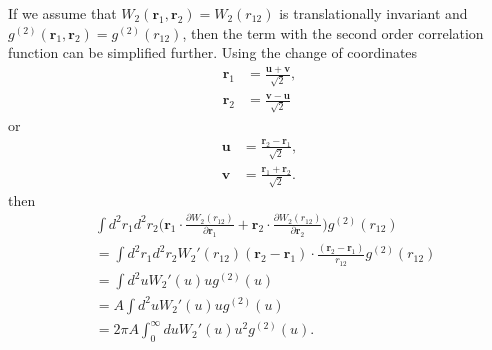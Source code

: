 \documentclass[../main.tex]{subfiles}
\begin{document}
If we assume that $W_2(\bm{r}_1,\bm{r}_2)=W_2(r_{12})$ is translationally
invariant and $g^{(2)}(\bm{r}_1,\bm{r}_2)=g^{(2)}(r_{12})$, then the term
with the second order correlation function can be simplified further.
Using the change of coordinates
\begin{align}
  \bm{r}_1&=\frac{\bm{u}+\bm{v}}{\sqrt{2}},\\
  \bm{r}_2&=\frac{\bm{v}-\bm{u}}{\sqrt{2}}
\end{align}
or
\begin{align}
  \bm{u}&=\frac{\bm{r}_2-\bm{r}_1}{\sqrt{2}},\\
  \bm{v}&=\frac{\bm{r}_1+\bm{r}_2}{\sqrt{2}}.
\end{align}
then
\begin{align}
  &\int d^2r_1d^2r_2\bigg(\bm{r}_1\cdot
  \frac{\partial W_2(r_{12})}{\partial \bm{r}_1}
  +\bm{r}_2\cdot
  \frac{\partial W_2(r_{12})}{\partial \bm{r}_2}\bigg)
  g^{(2)}(r_{12})\nonumber\\
  &=\int d^2r_1d^2r_2
  W_2'(r_{12})(\bm{r}_2-\bm{r}_1)\cdot
  \frac{(\bm{r}_2-\bm{r}_1)}{r_{12}}
  g^{(2)}(r_{12})\nonumber\\
  &=\int d^2u W_2'(u)u g^{(2)}(u)\nonumber\\
  &=A\int d^2u W_2'(u)u g^{(2)}(u)\nonumber\\
  &=2\pi A\int_0^{\infty} du W_2'(u)u^2 g^{(2)}(u).
\end{align}
\end{document}
